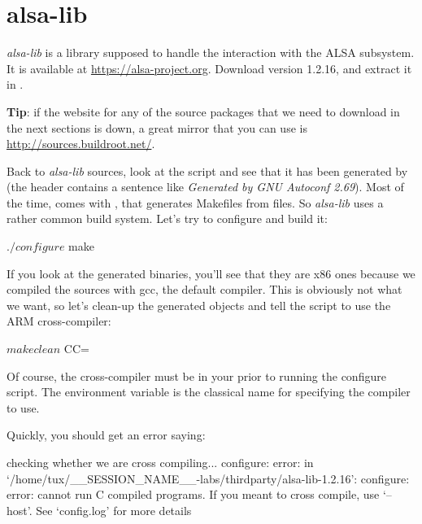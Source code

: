 \section{alsa-lib}

{\em alsa-lib} is a library supposed to handle the interaction with
the ALSA subsystem. It is available at \url{https://alsa-project.org}.
Download version 1.2.16, and extract it
in .

{\bf Tip}: if the website for any of the source packages that we
need to download in the next sections is down, a great mirror
that you can use is \url{http://sources.buildroot.net/}.

Back to {\em alsa-lib} sources, look at the  script
and see that it has been generated by  (the header
contains a sentence like {\em Generated by GNU Autoconf 2.69}). Most of
the time,  comes with , that generates
Makefiles from  files. So {\em alsa-lib} uses a rather
common build system. Let's try to configure and build it:

\begin{bashinput}
$ ./configure
$ make
\end{bashinput}

If you look at the generated binaries, you'll see that they are
x86 ones because we compiled the sources with gcc, the default compiler.
This is obviously not what we want, so let's clean-up the generated objects
and tell the  script to use the ARM cross-compiler:

\begin{bashinput}
$ make clean
$ CC=%
\end{bashinput}

Of course, the
cross-compiler must be in your  prior to running the
configure script. The  environment variable is the classical
name for specifying the compiler to use.

Quickly, you should get an error saying:

\begin{terminaloutput}
checking whether we are cross compiling... configure: error: in `/home/tux/__SESSION_NAME__-labs/thirdparty/alsa-lib-1.2.16':
configure: error: cannot run C compiled programs.
If you meant to cross compile, use `--host'.
See `config.log' for more details
\end{terminaloutput}
\normalsize

